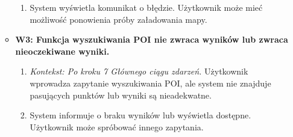 \documentclass[a4paper,12pt]{article}
\begin{document}
\begin{itemize}
\begin{itemize}
\begin{enumerate}
                    \item System wyświetla komunikat o błędzie. Użytkownik może mieć możliwość ponowienia próby załadowania mapy.
                \end{enumerate}
            \item \textbf{W3: Funkcja wyszukiwania POI nie zwraca wyników lub zwraca nieoczekiwane wyniki.}
                \begin{enumerate}
                    \item \textit{Kontekst: Po kroku 7 Głównego ciągu zdarzeń.} Użytkownik wprowadza zapytanie wyszukiwania POI, ale system nie znajduje pasujących punktów lub wyniki są nieadekwatne.
                    \item System informuje o braku wyników lub wyświetla dostępne. Użytkownik może spróbować innego zapytania.
                \end{enumerate}
        \end{itemize}
\end{itemize}
\end{document}
